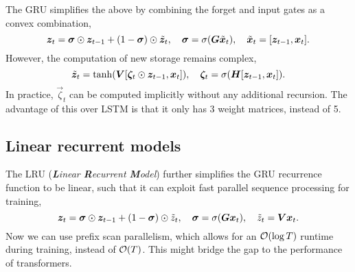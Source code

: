 The GRU simplifies the above by combining the forget and input gates as a convex combination, \[
    \vec{z}_t = \vec{\sigma} \odot \vec{z}_{t-1} + (1 - \vec{\sigma}) \odot \tilde{\vec{z}}_t, \quad \vec{\sigma} = \sigma \lft( \mat{G} \tilde{\vec{x}}_t \rgt), \quad \tilde{\vec{x}}_t = \lft[ \vec{z}_{t-1}, \vec{x}_t \rgt].
\]
However, the computation of new storage remains complex, \[
    \tilde{\vec{z}}_t = \tanh \lft( \mat{V} \lft[ \vec{\zeta}_t \odot \vec{z}_{t-1}, \vec{x}_t \rgt] \rgt), \quad \vec{\zeta}_t = \sigma \lft( \mat{H} \lft[ \vec{z}_{t-1}, \vec{x}_t \rgt] \rgt).
\]
In practice, $\vec{\zeta}_t$ can be computed implicitly without any additional recursion. The
advantage of this over LSTM is that it only has 3 weight matrices, instead of 5.

\subsection{Linear recurrent models}

The LRU (\textit{\textbf{L}inear \textbf{R}ecurrent \textbf{M}odel}) \citep{feng2024were} further
simplifies the GRU recurrence function to be linear, such that it can exploit fast parallel
sequence processing for training, \[
    \vec{z}_t = \vec{\sigma} \odot \vec{z}_{t-1} + (1-\vec{\sigma}) \odot \tilde{z}_t, \quad \vec{\sigma} = \sigma \lft( \mat{G} \vec{x}_t \rgt), \quad \tilde{z}_t = \mat{V} \vec{x}_t.
\]
Now we can use prefix scan parallelism, which allows for an $\bigo{\log T}$ runtime during
training, instead of $\bigo{T}$. This might bridge the gap to the performance of
transformers.

